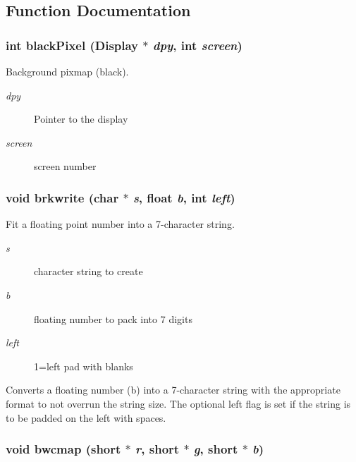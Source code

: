 \subsection{Function Documentation}
\subsubsection{\setlength{\rightskip}{0pt plus 5cm}int black\-Pixel (Display $\ast$ {\em dpy}, int {\em screen})}\label{xtv_8h_a115}


Background pixmap (black). 

\begin{Desc}
\item[Parameters:]
\begin{description}
\item[{\em dpy}]Pointer to the display \item[{\em screen}]screen number \end{description}
\end{Desc}
\subsubsection{\setlength{\rightskip}{0pt plus 5cm}void brkwrite (char $\ast$ {\em s}, float {\em b}, int {\em left})}\label{xtv_8h_a93}


Fit a floating point number into a 7-character string. 

\begin{Desc}
\item[Parameters:]
\begin{description}
\item[{\em s}]character string to create \item[{\em b}]floating number to pack into 7 digits \item[{\em left}]1=left pad with blanks\end{description}
\end{Desc}
Converts a floating number (b) into a 7-character string with the appropriate format to not overrun the string size. The optional left flag is set if the string is to be padded on the left with spaces. 
\subsubsection{\setlength{\rightskip}{0pt plus 5cm}void bwcmap (short $\ast$ {\em r}, short $\ast$ {\em g}, short $\ast$ {\em b})}\label{xtv_8h_a130}


